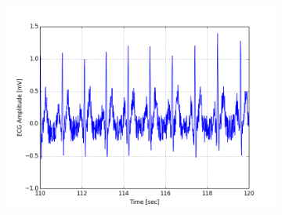 \documentclass[paper=a4, fontsize=11pt]{scrartcl}
\numberwithin{equation}{section}		%
\numberwithin{figure}{section}			%
\numberwithin{table}{section}		    %
\begin{document}
\begin{appendices}
\begin{figure}[H]
\begin{subfigure}[b]{0.3\textwidth}
		\includegraphics[width=\textwidth]{sim/ecg_12}
	\end{subfigure}
\end{figure}


\end{appendices}
\end{document}
